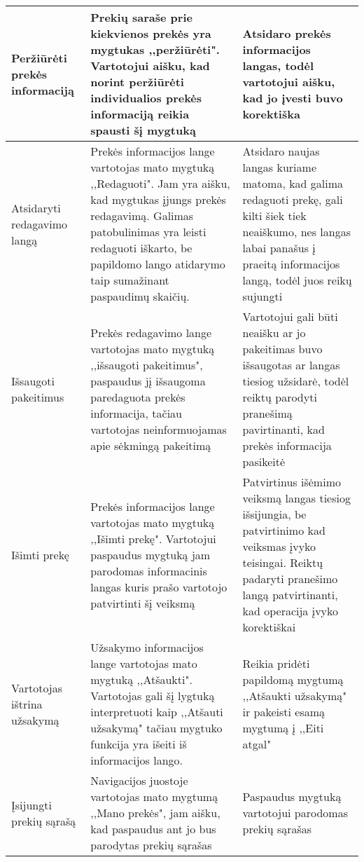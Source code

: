\documentclass[oneside]{VUMIFPSkursinis}
\begin{document}
\begin{center}
    \begin{tabular}{ |p{4cm}| p{6cm} | p{7cm} | }
    \hline
	Peržiūrėti prekės informaciją & Prekių saraše prie kiekvienos prekės yra mygtukas ,,peržiūrėti".
	Vartotojui aišku, kad norint peržiūrėti individualios prekės informaciją reikia spausti šį mygtuką & Atsidaro prekės informacijos langas, todėl vartotojui aišku, kad jo įvesti buvo korektiška \\ \hline
	Atsidaryti redagavimo langą & Prekės informacijos lange vartotojas mato mygtuką ,,Redaguoti".
	Jam yra aišku, kad mygtukas įjungs prekės redagavimą. Galimas patobulinimas yra leisti redaguoti iškarto, be papildomo lango atidarymo taip sumažinant paspaudimų skaičių. 
	& Atsidaro naujas langas kuriame matoma, kad galima redaguoti prekę, gali kilti šiek tiek neaiškumo, nes langas labai panašus į praeitą informacijos langą, todėl juos reikų sujungti \\ \hline
	Išsaugoti pakeitimus & Prekės redagavimo lange vartotojas  mato mygtuką ,,išsaugoti pakeitimus", paspaudus jį išsaugoma paredaguota prekės informacija, tačiau vartotojas neinformuojamas apie sėkmingą pakeitimą & Vartotojui gali būti neaišku ar jo pakeitimas buvo išsaugotas ar langas tiesiog užsidarė, todėl reiktų parodyti pranešimą pavirtinanti, kad prekės informacija pasikeitė \\ \hline
	Išimti prekę & Prekės informacijos lange vartotojas mato mygtuką ,,Išimti prekę". Vartotojui paspaudus mygtuką jam parodomas informacinis langas kuris prašo vartotojo patvirtinti šį veiksmą & Patvirtinus išėmimo veiksmą langas tiesiog išsijungia, be patvirtinimo kad veiksmas įvyko teisingai. Reiktų padaryti pranešimo langą patvirtinanti, kad operacija įvyko korektiškai \\ \hline
	Vartotojas ištrina užsakymą & Užsakymo informacijos lange vartotojas mato mygtuką ,,Atšaukti". Vartotojas gali šį lygtuką interpretuoti kaip ,,Atšauti užsakymą" tačiau mygtuko funkcija yra išeiti iš informacijos lango.&
	Reikia pridėti papildomą mygtumą ,,Atšaukti užsakymą" ir pakeisti esamą mygtumą į ,,Eiti atgal" \\ \hline
	Įsijungti prekių sąrašą & Navigacijos juostoje vartotojas mato mygtumą ,,Mano prekės", jam aišku, kad paspaudus ant jo bus parodytas prekių sąrašas & Paspaudus mygtuką vartotojui parodomas prekių sąrašas \\ \hline
   \hline
    \end{tabular}
\end{center}
\pagebreak
\end{document}
